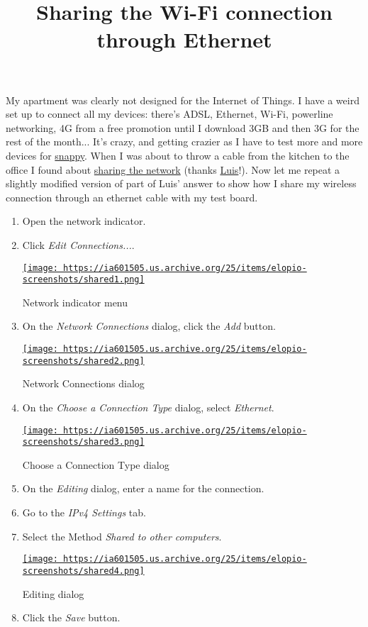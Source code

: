\documentclass[12pt]{article}
\title{Sharing the Wi-Fi connection through Ethernet}
\begin{document}
My apartment was clearly not designed for the Internet of Things. I have a
weird set up to connect all my devices: there's ADSL, Ethernet, Wi-Fi,
powerline networking, 4G from a free promotion until I download 3GB and then
3G for the rest of the month... It's crazy, and getting crazier as I have to
test more and more devices for
\href{https://developer.ubuntu.com/en/snappy/start/}{snappy}. When I was about
to throw a cable from the kitchen to the office I found about
\href{http://askubuntu.com/a/174027/61416}{sharing the network} (thanks
\href{https://askubuntu.com/users/7035/luis-alvarado}{Luis}!). Now let me
repeat a slightly modified version of part of Luis' answer to show how I
share my wireless connection through an ethernet cable with my test board.

\begin{enumerate}
  \item Open the network indicator.
  \item Click \emph{Edit Connections...}.
    \begin{center}
      \href{
        https://ia601505.us.archive.org/25/items/elopio-screenshots/shared1.png}{
        \texttt{[image: 
          https://ia601505.us.archive.org/25/items/elopio-screenshots/shared1.png]}
      }
      \caption{Network indicator menu}
    \end{center}
  \item On the \emph{Network Connections} dialog, click the \emph{Add} button.
    \begin{center}
      \href{
        https://ia601505.us.archive.org/25/items/elopio-screenshots/shared2.png}{
        \texttt{[image: 
          https://ia601505.us.archive.org/25/items/elopio-screenshots/shared2.png]}
      }
      \caption{Network Connections dialog}
    \end{center}
  \item On the \emph{Choose a Connection Type} dialog, select \emph{Ethernet}.
    \begin{center}
      \href{
        https://ia601505.us.archive.org/25/items/elopio-screenshots/shared3.png}{
        \texttt{[image: 
          https://ia601505.us.archive.org/25/items/elopio-screenshots/shared3.png]}
      }
      \caption{Choose a Connection Type dialog}
    \end{center}
  \item On the \emph{Editing} dialog, enter a name for the connection.
  \item Go to the \emph{IPv4 Settings} tab.
  \item Select the Method \emph{Shared to other computers}.
    \begin{center}
      \href{
        https://ia601505.us.archive.org/25/items/elopio-screenshots/shared4.png}{
        \texttt{[image: 
          https://ia601505.us.archive.org/25/items/elopio-screenshots/shared4.png]}
      }
      \caption{Editing dialog}
    \end{center}
  \item Click the \emph{Save} button.
\end{enumerate}
\end{document}
